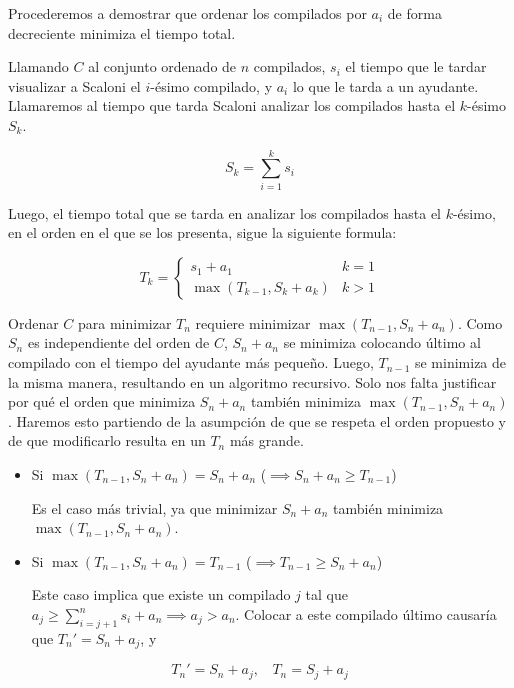 Procederemos a demostrar que ordenar los compilados por $a_i$ de forma decreciente minimiza el tiempo total.

Llamando $C$ al conjunto ordenado de $n$ compilados, $s_i$ el tiempo que le tardar visualizar a Scaloni el $i$-ésimo compilado, y
$a_i$ lo que le tarda a un ayudante. Llamaremos al tiempo que tarda Scaloni analizar los compilados hasta el $k$-ésimo $S_k$.

$$
S_{k}=\sum_{i=1}^{k}s_{i} 
$$

Luego, el tiempo total que se tarda en analizar los compilados hasta el $k$-ésimo, en el orden
en el que se los presenta, sigue la siguiente formula:


$$
T_{k} = \begin{cases}
s_{1}+a_{1} & k=1 \\
\displaystyle\max{(T_{k-1},S_{k}+a_{k})} & k>1
\end{cases}
$$

Ordenar $C$ para minimizar $T_{n}$ requiere minimizar $\max{(T_{n-1},S_{n}+a_{n})}$. Como $S_{n}$ es independiente del orden de $C$, $S_{n}+a_{n}$ se minimiza colocando último al compilado con el tiempo del ayudante más pequeño. Luego, $T_{n-1}$ se minimiza de la misma manera, resultando en un algoritmo recursivo. Solo nos falta justificar por qué el orden que minimiza $S_{n}+a_{n}$ también minimiza $\max{(T_{n-1},S_{n}+a_{n})}$. Haremos esto partiendo de la asumpción de que se respeta el orden propuesto y de que modificarlo resulta en un $T_n$ más grande.

\begin{itemize}

    \item Si $\max{(T_{n-1},S_{n}+a_{n})} = S_{n}+a_{n}$ ($\implies S_{n}+a_{n} \geq T_{n-1}$)

    Es el caso más trivial, ya que minimizar $S_{n}+a_{n}$ también minimiza $\max{(T_{n-1},S_{n}+a_{n})}$.

    \item Si $\max{(T_{n-1},S_{n}+a_{n})} = T_{n-1}$ ($\implies T_{n-1} \geq S_{n}+a_{n}$)

    Este caso implica que existe un compilado $j$ tal que $a_{j} \geq \sum^{n}_{i=j+1}s_{i}+a_{n} \implies a_{j} > a_{n}$.
    Colocar a este compilado último causaría que $T_{n}'= S_{n}+a_{j}$, y

\end{itemize}

$$
T_{n}' = S_{n}+a_{j}, \ \ \ \  T_{n} = S_{j}+a_{j} 
$$

